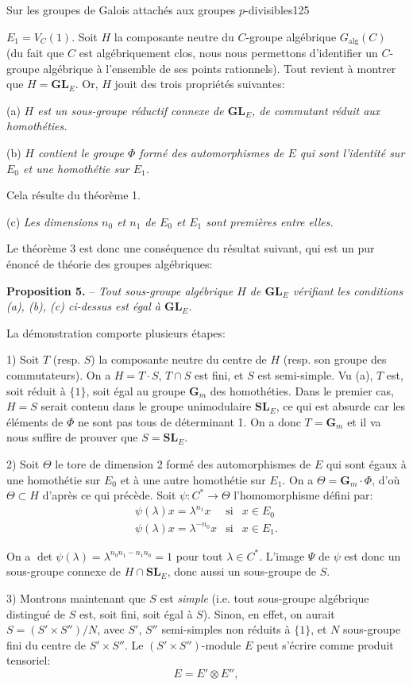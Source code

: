 Sur les groupes de Galois attachés aux groupes $p$-divisibles\hfill 125

$E_1=V_C(1)$. Soit $H$ la composante neutre du $C$-groupe algébrique $G_{\mathrm{alg}}(C)$ (du fait que $C$ est algébriquement clos, nous nous permettons d'identifier un $C$-groupe algébrique à l'ensemble de ses points rationnels). Tout revient à montrer que $H=\mathbf{GL}_E$. Or, $H$ jouit des trois propriétés suivantes:

(a) \textit{$H$ est un sous-groupe réductif connexe de $\mathbf{GL}_E$, de commutant réduit aux homothéties.}

(b) \textit{$H$ contient le groupe $\Phi$ formé des automorphismes de $E$ qui sont l'identité sur $E_0$ et une homothétie sur $E_1$.}

Cela résulte du théorème 1.

(c) \textit{Les dimensions $n_0$ et $n_1$ de $E_0$ et $E_1$ sont premières entre elles.}

Le théorème 3 est donc une conséquence du résultat suivant, qui est un pur énoncé de théorie des groupes algébriques:

\textbf{Proposition 5.} -- \textit{Tout sous-groupe algébrique $H$ de $\mathbf{GL}_E$ vérifiant les conditions (a), (b), (c) ci-dessus est égal à $\mathbf{GL}_E$.}

La démonstration comporte plusieurs étapes:

1) Soit $T$ (resp. $S$) la composante neutre du centre de $H$ (resp. son groupe des commutateurs). On a $H=T\cdot S$, $T\cap S$ est fini, et $S$ est semi-simple. Vu (a), $T$ est, soit réduit à $\{1\}$, soit égal au groupe $\mathbf G_m$ des homothéties. Dans le premier cas, $H=S$ serait contenu dans le groupe unimodulaire $\mathbf{SL}_E$, ce qui est absurde car les éléments de $\Phi$ ne sont pas tous de déterminant 1. On a donc $T=\mathbf G_m$ et il va nous suffire de prouver que $S=\mathbf{SL}_E$.

2) Soit $\Theta$ le tore de dimension 2 formé des automorphismes de $E$ qui sont égaux à une homothétie sur $E_0$ et à une autre homothétie sur $E_1$. On a $\Theta=\mathbf G_m\cdot\Phi$, d'où $\Theta\subset H$ d'après ce qui précède. Soit $\psi:C^*\to\Theta$ l'homomorphisme défini par:
\[
\begin{array}{lll}
\psi(\lambda)x=\lambda^{n_1}x&\text{si}&x\in E_0\\
\psi(\lambda)x=\lambda^{-n_0}x&\text{si}&x\in E_1.
\end{array}
\]

On a $\det\psi(\lambda)=\lambda^{n_0n_1-n_1n_0}=1$ pour tout $\lambda\in C^*$. L'image $\Psi$ de $\psi$ est donc un sous-groupe connexe de $H\cap\mathbf{SL}_E$, donc aussi un sous-groupe de $S$.

3) Montrons maintenant que $S$ est \textit{simple} (i.e. tout sous-groupe algébrique distingué de $S$ est, soit fini, soit égal à $S$). Sinon, en effet, on aurait $S=(S'\times S'')/N$, avec $S'$, $S''$ semi-simples non réduits à $\{1\}$, et $N$ sous-groupe fini du centre de $S'\times S''$. Le $(S'\times S'')$-module $E$ peut s'écrire comme produit tensoriel:
\[
E=E'\otimes E'',
\]

